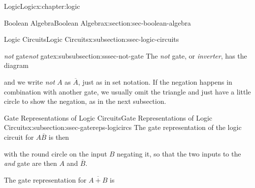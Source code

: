 \documentclass[twoside,10pt,]{book}
\numberwithin{equation}{section}
\begin{document}
\begin{chapterptx}{Logic}{}{Logic}{}{}{x:chapter:logic}
\begin{sectionptx}{Boolean Algebra}{}{Boolean Algebra}{}{}{x:section:sec-boolean-algebra}
\begin{subsectionptx}{Logic Circuits}{}{Logic Circuits}{}{}{x:subsection:ssec-logic-circuits}
\typeout{************************************************}
%
\begin{subsubsectionptx}{\emph{not} gate}{}{\emph{not} gate}{}{}{x:subsubsection:sssec-not-gate}
The \emph{not} gate, or \emph{inverter}, has the diagram  \begin{image}{0.4}{0.2}{0.4}%
%
\end{image}%
 and we write \emph{not} \(A\) as \(\overline{A}\), just as in set notation.  If the negation happens in combination with another gate, we usually omit the triangle and just have a little circle to show the negation, as in the next subsection.%
\end{subsubsectionptx}
\end{subsectionptx}
%
%
\typeout{************************************************}
\typeout{************************************************}
%
\begin{subsectionptx}{Gate Representations of Logic Circuits}{}{Gate Representations of Logic Circuits}{}{}{x:subsection:ssec-gatereps-logicircs}
The gate representation of the logic circuit for \(A\overline{B}\) is then \begin{image}{0.35}{0.3}{0.35}%
%
\end{image}%
 with the round circle on the input \(B\) negating it, so that the two inputs to the \emph{and} gate are then \(A\) and \(\overline{B}\).%
\par
The gate representation for \(\overline{A+B}\) is \begin{image}{0.35}{0.3}{0.35}%
\end{image}
\end{subsectionptx}
\end{sectionptx}
\end{chapterptx}
\end{document}
